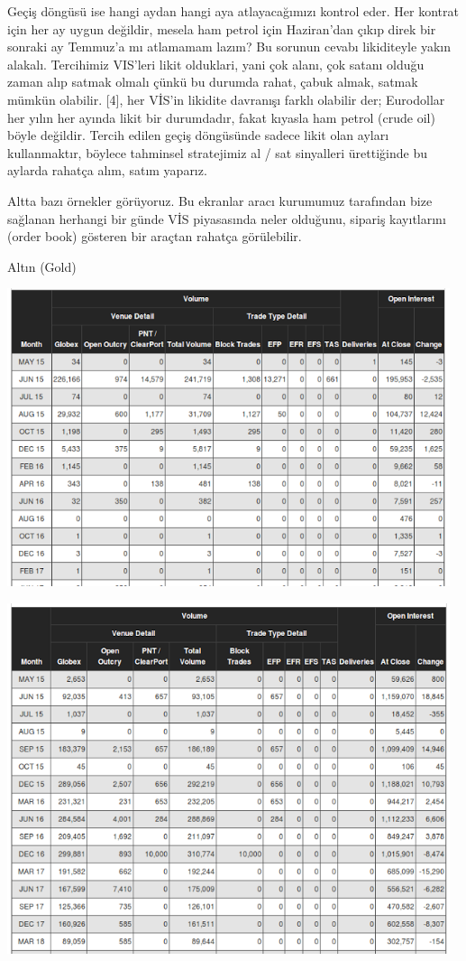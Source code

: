 \documentclass[12pt,fleqn]{article}\usepackage{../../common}
\begin{document}
Geçiş döngüsü ise hangi aydan hangi aya atlayacağımızı kontrol eder. Her kontrat
için her ay uygun değildir, mesela ham petrol için Haziran'dan çıkıp direk bir
sonraki ay Temmuz'a mı atlamamam lazım?  Bu sorunun cevabı likiditeyle yakın
alakalı. Tercihimiz VIS'leri likit olduklari, yani çok alanı, çok satanı olduğu
zaman alıp satmak olmalı çünkü bu durumda rahat, çabuk almak, satmak mümkün
olabilir. [4], her VİS'in likidite davranışı farklı olabilir der; Eurodollar her
yılın her ayında likit bir durumdadır, fakat kıyasla ham petrol (crude oil)
böyle değildir. Tercih edilen geçiş döngüsünde sadece likit olan ayları
kullanmaktır, böylece tahminsel stratejimiz al / sat sinyalleri ürettiğinde bu
aylarda rahatça alım, satım yaparız. 

Altta bazı örnekler görüyoruz. Bu ekranlar aracı kurumumuz tarafından
bize sağlanan herhangi bir günde VİS piyasasında neler olduğunu, sipariş
kayıtlarını (order book) gösteren bir araçtan rahatça görülebilir.

Altın (Gold)

\includegraphics[width=13cm]{case_1.png}

\includegraphics[width=13cm]{case_2.png}
\end{document}
